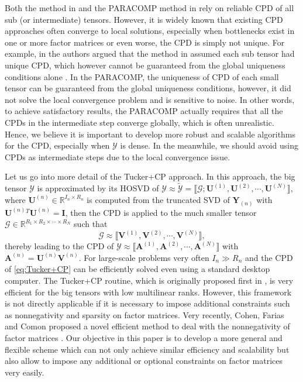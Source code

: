 \documentclass[10pt,twocolumn,twoside]{IEEEtran}
\newcommand{\mat}[1]{\ensuremath{\mathbf{#1}}}
\newcommand{\matI}{\mat{I}}
\newcommand{\tensor}[1]{\ensuremath{\boldsymbol{\mathscr{#1}}}}
\newcommand{\tenmat}[2][n]{\ensuremath{{\mathbf{#2}}_{(#1)}}}
\newcommand{\matn}[2][n]{\ensuremath{\mathbf{#2}^{(#1)}}}
\newcommand{\compactTucker}[2]{\ensuremath{\llbracket \tensor{#1}; {\mathbf{#2}}^{(1)}, {\mathbf{#2}}^{(2)}, \cdots, {\mathbf{#2}}^{(N)}\rrbracket}}
\newcommand{\compactcp}[1]{\ensuremath{\llbracket {\mathbf{#1}}^{(1)}, {\mathbf{#1}}^{(2)}, \cdots, {\mathbf{#1}}^{(N)}\rrbracket}}
\newcommand{\Real}{\ensuremath{\mathbb{R}}}
\begin{document}
Both the method in \cite{gridPARAFAC} and the PARACOMP method in \cite{spm2014_paracomp} rely on reliable CPD of all sub (or intermediate) tensors. However, it is widely known that existing CPD approaches often converge to local solutions, especially when bottlenecks exist in one or more factor matrices \cite{PComon2009} or even worse,  the CPD is simply not unique.  For example, in \cite{spm2014_paracomp} the authors argued that the method in  \cite{gridPARAFAC} assumed each sub tensor had unique CPD, which however cannot be guaranteed from the global uniqueness conditions alone \cite{spm2014_paracomp}. In the PARACOMP,  the uniqueness of CPD of each small tensor can be guaranteed from the global uniqueness conditions, however, it did not solve the local convergence problem and is sensitive to noise.  In other words, to achieve satisfactory results, the PARACOMP actually requires that all the CPDs in the intermediate step  converge globally, which is often unrealistic. Hence, we believe it is  important to develop more robust and scalable algorithms for the CPD, especially when \tensor{Y} is dense. In the meanwhile, we should avoid using CPDs as intermediate steps due to the local convergence issue.


Let us go into more detail of the Tucker+CP approach. In this approach, the big tensor \tensor{Y} is approximated by its HOSVD of $\tensor{Y}\approx\tensor{\tilde{Y}}=\compactTucker{G}{U}$, where $\matn{U}\in\Real^{I_n\times R_n}$ is computed from the truncated SVD of \tenmat{Y} with $\matn{U}{}^T\matn{U}=\matI$, then the CPD is applied to the much smaller tensor  $\tensor{G}\in\Real^{R_1\times R_2 \times\cdots\times R_N}$ such that
\begin{equation}
\label{eq:Tucker+CP}
\tensor{G}\approx\compactcp{V},
\end{equation}
thereby leading to the CPD of $\tensor{Y}\approx\compactcp{A}$ with $\matn{A}=\matn{U}\matn{V}$.
For large-scale problems very often $I_n\gg R_n$ and the CPD of \eqref{eq:Tucker+CP} can be efficiently solved even using a standard desktop computer. 
The Tucker+CP routine, which is originally proposed first  in \cite{BroTuckerPD}, is very efficient for the big tensors with low multilinear ranks. However, this framework is not directly applicable if  it is necessary  to impose additional constraints such as nonnegativity and sparsity on factor matrices. Very recently, Cohen, Farias and Comon proposed a novel efficient method to deal with the nonnegativity of factor matrices \cite{ComonNTF}. Our objective in this paper is to develop a more general and flexible scheme which can  not only achieve similar efficiency and scalability but also allow  to  impose  any  additional or optional constraints on factor matrices very easily.
 
\end{document}
